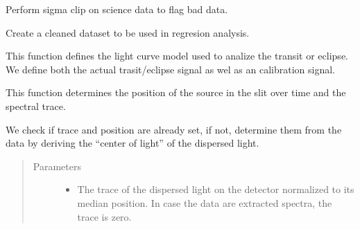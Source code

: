 \documentclass[a4paper,11pt,english]{sphinxmanual}
\begin{document}
\begin{fulllineitems}
\begin{fulllineitems}
\end{fulllineitems}


\begin{fulllineitems}
\label{\detokenize{cascade.TSO:cascade.TSO.TSO.TSOSuite.sigma_clip_data}}
Perform sigma clip on science data to flag bad data.

\end{fulllineitems}


\begin{fulllineitems}
\label{\detokenize{cascade.TSO:cascade.TSO.TSO.TSOSuite.create_cleaned_dataset}}
Create a cleaned dataset to be used in regresion analysis.

\end{fulllineitems}


\begin{fulllineitems}
\label{\detokenize{cascade.TSO:cascade.TSO.TSO.TSOSuite.define_eclipse_model}}
This function defines the light curve model used to analize the
transit or eclipse. We define both the actual trasit/eclipse signal
as wel as an calibration signal.

\end{fulllineitems}


\begin{fulllineitems}
\label{\detokenize{cascade.TSO:cascade.TSO.TSO.TSOSuite.determine_source_position}}
This function determines the position of the source in the slit
over time and the spectral trace.

We check if trace and position are already set, if not, determine them
from the data by deriving the “center of light” of the dispersed
light.
\begin{quote}\begin{description}
\item[{Parameters}] \leavevmode\begin{itemize}
\item {} 
 \textendash{} The trace of the dispersed light on the detector normalized
to its median position. In case the data are extracted spectra,
the trace is zero.


\end{itemize}
\end{description}
\end{quote}
\end{fulllineitems}
\end{fulllineitems}
\end{document}
